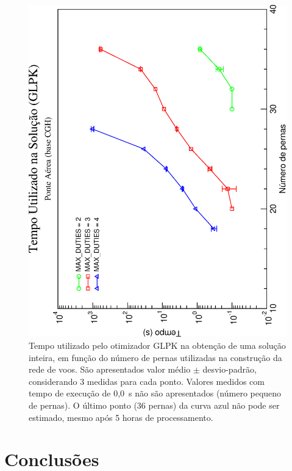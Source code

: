 \documentclass[12pt,a4paper]{article}
\begin{document}
\begin{figure}[htb]
	\begin{center}
		\includegraphics[scale=0.45,angle=-90]{fig/glpk_solution_time.eps}
		\caption{Tempo utilizado pelo otimizador GLPK na obtenção de uma solução inteira, em função do 
		número de pernas utilizadas na construção da rede de voos. São apresentados valor médio $\pm$ 
		desvio-padrão, considerando 3 medidas para cada ponto. Valores medidos com tempo de execução 
		de 0,0~s não são apresentados (número pequeno de pernas). O último ponto (36 pernas) da curva 
		azul não pode ser estimado, mesmo após 5 horas de processamento.}
		\label{fig:solution}
	\end{center}
\end{figure}


\section{Conclusões}
\label{sec:conclusoes}
\end{document}
